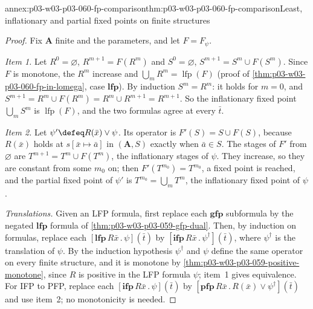 \begin{annexitem}{annex:p03-w03-p03-060-fp-comparison}{thm:p03-w03-p03-060-fp-comparison}{Least, inflationary and partial fixed points on finite structures}
\begin{proof}
Fix \(\mathbf A\) finite and the parameters, and let \(F=F_\psi\).

\emph{Item 1.} Let \(R^0=\varnothing\), \(R^{m+1}=F(R^m)\) and
\(S^0=\varnothing\), \(S^{m+1}=S^m\cup F(S^m)\). Since \(F\) is monotone,
the \(R^m\) increase and \(\bigcup_mR^m=\operatorname{lfp}(F)\) (proof of
\cref{thm:p03-w03-p03-060-fp-in-lomega}, case \(\mathbf{lfp}\)). By
induction \(S^m=R^m\): it holds for \(m=0\), and
\(S^{m+1}=R^m\cup F(R^m)=R^m\cup R^{m+1}=R^{m+1}\). So the inflationary
fixed point \(\bigcup_mS^m\) is \(\operatorname{lfp}(F)\), and the two
formulas agree at every \(\bar t\).

\emph{Item 2.} Let \(\psi'\defeq R(\bar x)\vee\psi\). Its operator is
\(F'(S)=S\cup F(S)\), because \(R(\bar x)\) holds at
\(s[\bar x\mapsto\bar a]\) in \((\mathbf A,S)\) exactly when
\(\bar a\in S\). The stages of \(F'\) from \(\varnothing\) are
\(T^{m+1}=T^m\cup F(T^m)\), the inflationary stages of \(\psi\). They
increase, so they are constant from some \(m_0\) on; then
\(F'(T^{m_0})=T^{m_0}\), a fixed point is reached, and the partial fixed
point of \(\psi'\) is \(T^{m_0}=\bigcup_mT^m\), the inflationary fixed
point of \(\psi\).

\emph{Translations.} Given an LFP formula, first replace each
\(\mathbf{gfp}\) subformula by the negated \(\mathbf{lfp}\) formula of
\cref{thm:p03-w03-p03-059-gfp-dual}. Then, by induction on formulas,
replace each \([\mathbf{lfp}\,R\bar x\,.\,\psi](\bar t)\) by
\([\mathbf{ifp}\,R\bar x\,.\,\psi^\dagger](\bar t)\), where \(\psi^\dagger\)
is the translation of \(\psi\). By the induction hypothesis \(\psi^\dagger\)
and \(\psi\) define the same operator on every finite structure, and it is
monotone by \cref{thm:p03-w03-p03-059-positive-monotone}, since \(R\) is
positive in the LFP formula \(\psi\); item~1 gives equivalence. For IFP to
PFP, replace each \([\mathbf{ifp}\,R\bar x\,.\,\psi](\bar t)\) by
\([\mathbf{pfp}\,R\bar x\,.\,R(\bar x)\vee\psi^\dagger](\bar t)\) and use
item~2; no monotonicity is needed.
\end{proof}
\end{annexitem}

